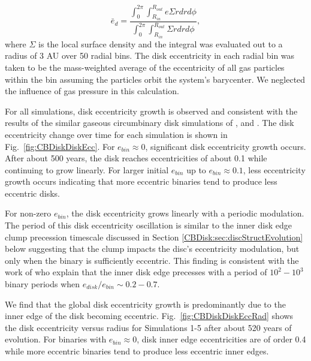 \begin{equation}
\bar{e}_d = \frac{\int_0^{2 \pi} \int^{R_{out}}_{R_{in}} e \Sigma r dr d\phi }{\int_0^{2 \pi} \int^{R_{out}}_{R_{in}} \Sigma r dr d\phi},
\end{equation}
where $\Sigma$ is the local surface density and the integral was
evaluated out to a radius of 3 AU over 50 radial bins.  The disk eccentricity in each radial bin was taken to be the mass-weighted average of the eccentricity of all gas particles within the bin assuming the particles orbit the system's barycenter.  We neglected the influence of gas pressure in this calculation.

For all simulations, disk eccentricity growth is observed and consistent with the results
of the similar gaseous circumbinary disk simulations of \citet{Kley2008}, \citet{Pierens2007,Pierens2013} and \citet{Farris2014}.  The disk eccentricity 
change over time for each simulation is shown in Fig.~\ref{fig:CBDiskDiskEcc}. For $e_{bin} \approx 0$, significant disk eccentricity growth occurs.  
After about 500 years, the disk reaches eccentricities of about 0.1 while continuing to grow linearly.  For larger initial $e_{bin}$ up 
to $e_{bin} \approx 0.1$, less eccentricity growth occurs indicating that more eccentric binaries tend to produce less eccentric disks.

For non-zero $e_{bin}$, the disk eccentricity grows linearly with a
periodic modulation.  The period of this disk eccentricity oscillation
is similar to the inner disk edge clump precession timescale discussed
in Section \ref{CBDisk:sec:discStructEvolution} below suggesting that the clump impacts the disc's eccentricity modulation, but only when the binary is sufficiently eccentric.  This finding is consistent with the work of \citet{Artymowicz2000} who explain that the inner disk edge precesses with a period of $10^2 - 10^3$ binary periods when $e_{disk}/e_{bin} \sim 0.2-0.7$.  

We find that the global disk eccentricity growth is predominantly due to the inner edge of the disk becoming eccentric.  Fig.~\ref{fig:CBDiskDiskEccRad} shows the disk eccentricity versus radius for Simulations 1-5 after about 520 years of evolution.  For binaries with $e_{bin} \approx 0$, disk inner edge eccentricities are of order 0.4 while more eccentric binaries tend to produce less eccentric inner edges.

